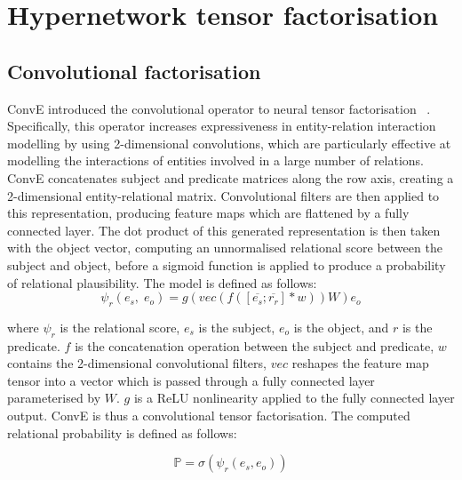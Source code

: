 \newpage



\section{Hypernetwork tensor factorisation}

\subsection{Convolutional factorisation}
ConvE introduced the convolutional operator to neural tensor factorisation \unskip ~\citep{dettmers2018convolutional}. Specifically, this operator increases expressiveness in entity-relation interaction modelling by using 2-dimensional convolutions, which are particularly effective at modelling the interactions of entities involved in a large number of relations. ConvE concatenates subject and predicate matrices along the row axis, creating a 2-dimensional entity-relational matrix. Convolutional filters are then applied to this representation, producing feature maps which are flattened by a fully connected layer. The dot product of this generated representation is then taken with the object vector, computing an unnormalised relational score between the subject and object, before a sigmoid function is applied to produce a probability of relational plausibility. The model is defined as follows:
\begin{equation}
	\psi_r(e_s, \; e_o) = g(vec(f(\left [ \overline{e_s}; \overline{r_r} \right ]*w))W)e_o
\end{equation}

\noindent where $ \psi_r $ is the relational score, $ e_s $ is the subject, $ e_o $ is the object, and $ r $ is the predicate. $ f $ is the concatenation operation between the subject and predicate, $ w $ contains the 2-dimensional convolutional filters, $ vec $ reshapes the feature map tensor into a vector which is passed through a fully connected layer parameterised by $ W $. $ g $ is a ReLU nonlinearity applied to the fully connected layer output. ConvE is thus a convolutional tensor factorisation. The computed relational probability is defined as follows: 

\begin{equation}
	\mathbb{P} = \sigma(\psi_r(e_s,e_o)) 
\end{equation}

